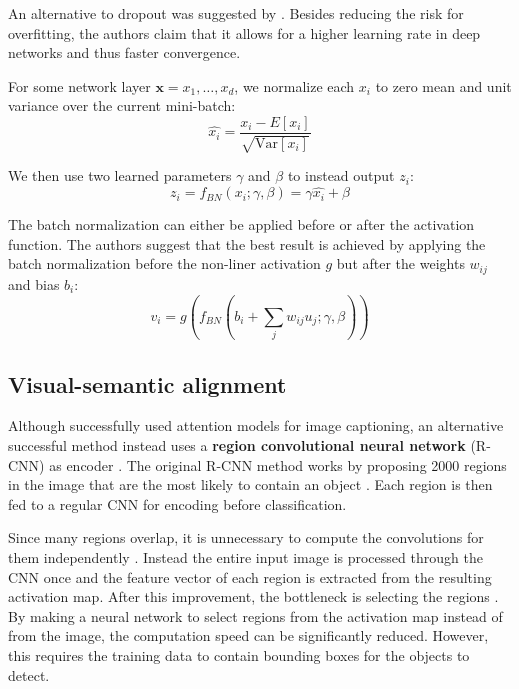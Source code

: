 An alternative to dropout was suggested by \textcite{BatchNormalization}. Besides reducing the risk for overfitting, the authors claim that it allows for a higher learning rate in deep networks and thus faster convergence.

For some network layer $\mathbf{x} = {x_1, \ldots, x_d}$, we normalize each $x_i$ to zero mean and unit variance over the current mini-batch:
\[
\hat{x_i} = \frac{x_i - E[x_i]}{ \sqrt{\text{Var} [x_i]} }
\]

We then use two learned parameters $\gamma$ and $\beta$ to instead output $z_i$:
\[
z_i = f_{BN}(x_i; \gamma, \beta) = \gamma \hat{x_i} + \beta
\]

The batch normalization can either be applied before or after the activation function. The authors suggest that the best result is achieved by applying the batch normalization before the non-liner activation $g$ but after the weights $w_{ij}$ and bias $b_i$:
\[
v_i = g\left( f_{BN}\left( b_i + \sum_j w_{ij} u_j; \gamma, \beta \right) \right)
\]

\subsection{Visual-semantic alignment}


Although \textcite{AttendAndTell} successfully used attention models for image captioning,
an alternative successful method instead uses a \textbf{region convolutional neural network} (R-CNN) as encoder \cite{VisualSemanticAlignment}.
The original R-CNN method works by proposing 2000 regions in the image that are the most likely to contain an object \cite{RCNN}. Each region is then fed to a regular CNN for encoding before classification.

Since many regions overlap, it is unnecessary to compute the convolutions for them independently \cite{FastRCNN}. Instead the entire input image is processed through the CNN once and the feature vector of each region is extracted from the resulting activation map. After this improvement, the bottleneck is selecting the regions \cite{FasterRCNN}. By making a neural network to select regions from the activation map instead of from the image, the computation speed can be significantly reduced. However, this requires the training data to contain bounding boxes for the objects to detect.

